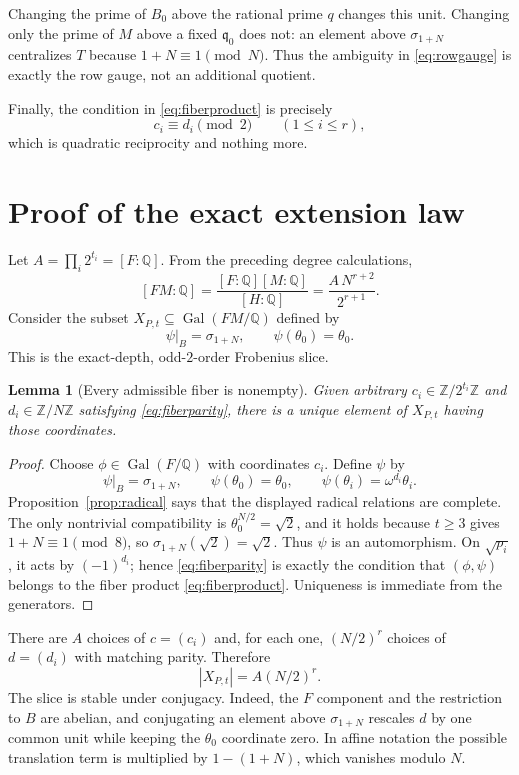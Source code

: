 \documentclass[11pt]{article}
\newtheorem{lemma}[theorem]{Lemma}
\theoremstyle{definition}
\theoremstyle{remark}
\newcommand{\Z}{\mathbb Z}
\newcommand{\Q}{\mathbb Q}
\newcommand{\Gal}{\operatorname{Gal}}
\begin{document}
Changing the prime of $B_0$ above the rational prime $q$ changes this unit.
Changing only the prime of $M$ above a fixed $\mathfrak q_0$ does not:
an element above $\sigma_{1+N}$ centralizes $T$ because $1+N\equiv1\pmod
N$.  Thus the ambiguity in \eqref{eq:rowgauge} is exactly the row gauge,
not an additional quotient.

Finally, the condition in \eqref{eq:fiberproduct} is precisely
\begin{equation}\label{eq:fiberparity}
  c_i\equiv d_i\pmod2\qquad(1\le i\le r),
\end{equation}
which is quadratic reciprocity and nothing more.

\section{Proof of the exact extension law}

Let $A=\prod_i2^{t_i}=[F:\Q]$.  From the preceding degree calculations,
\begin{equation}\label{eq:grouporder}
 [FM:\Q]=\frac{[F:\Q][M:\Q]}{[H:\Q]}
 =\frac{A\,N^{r+2}}{2^{r+1}}.
\end{equation}
Consider the subset $X_{P,t}\subseteq\Gal(FM/\Q)$ defined by
\[
 \psi|_B=\sigma_{1+N},\qquad \psi(\theta_0)=\theta_0.
\]
This is the exact-depth, odd-$2$-order Frobenius slice.

\begin{lemma}[Every admissible fiber is nonempty]\label{lem:nonempty}
Given arbitrary $c_i\in\Z/2^{t_i}\Z$ and $d_i\in\Z/N\Z$ satisfying
\eqref{eq:fiberparity}, there is a unique element of $X_{P,t}$ having those
coordinates.
\end{lemma}

\begin{proof}
Choose $\phi\in\Gal(F/\Q)$ with coordinates $c_i$.  Define $\psi$ by
\[
 \psi|_B=\sigma_{1+N},\qquad
 \psi(\theta_0)=\theta_0,\qquad
 \psi(\theta_i)=\omega^{d_i}\theta_i.
\]
Proposition~\ref{prop:radical} says that the displayed radical relations
are complete.  The only nontrivial compatibility is
$\theta_0^{N/2}=\sqrt2$, and it holds because $t\ge3$ gives
$1+N\equiv1\pmod8$, so $\sigma_{1+N}(\sqrt2)=\sqrt2$.  Thus $\psi$ is an
automorphism.  On $\sqrt{p_i}$, it acts by $(-1)^{d_i}$; hence
\eqref{eq:fiberparity} is exactly the condition that $(\phi,\psi)$ belongs
to the fiber product \eqref{eq:fiberproduct}.  Uniqueness is immediate
from the generators.
\end{proof}

There are $A$ choices of $c=(c_i)$ and, for each one, $(N/2)^r$ choices of
$d=(d_i)$ with matching parity.  Therefore
\begin{equation}\label{eq:slicesize}
  |X_{P,t}|=A(N/2)^r.
\end{equation}
The slice is stable under conjugacy.  Indeed, the $F$ component and the
restriction to $B$ are abelian, and conjugating an element above
$\sigma_{1+N}$ rescales $d$ by one common unit while keeping the
$\theta_0$ coordinate zero.  In affine notation the possible translation
term is multiplied by $1-(1+N)$, which vanishes modulo $N$.
\end{document}
